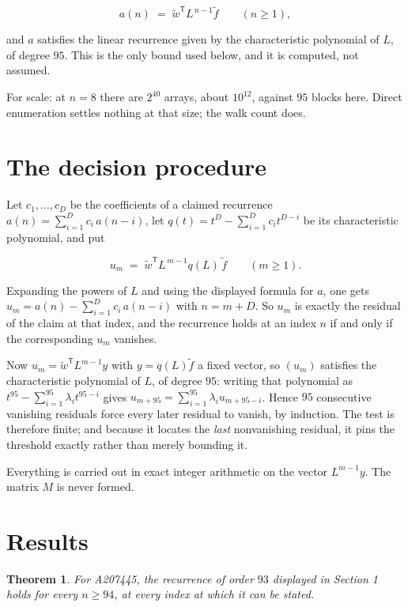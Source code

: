 \documentclass[11pt]{article}
\newtheorem{theorem}{Theorem}
\theoremstyle{definition}
\begin{document}
\[a(n) \;=\; \tilde w^{\mathsf T} L^{\,n-1} \tilde f \qquad (n \ge 1),\]

and $a$ satisfies the linear recurrence given by the characteristic polynomial of $L$, of degree $95$. This is the only bound used below, and it is computed, not assumed.

For scale: at $n = 8$ there are $2^{40}$ arrays, about $10^{12}$, against $95$ blocks here. Direct enumeration settles nothing at that size; the walk count does.

\section{The decision procedure}

Let $c_1,\dots,c_D$ be the coefficients of a claimed recurrence $a(n) = \sum_{i=1}^{D} c_i\,a(n-i)$, let $q(t) = t^{D} - \sum_{i=1}^{D} c_i t^{D-i}$ be its characteristic polynomial, and put

\[u_m \;=\; \tilde w^{\mathsf T} L^{\,m-1} q(L)\,\tilde f \qquad (m \ge 1).\]

Expanding the powers of $L$ and using the displayed formula for $a$, one gets $u_m = a(n) - \sum_{i=1}^{D} c_i\,a(n-i)$ with $n = m + D$. So $u_m$ is exactly the residual of the claim at that index, and the recurrence holds at an index $n$ if and only if the corresponding $u_m$ vanishes.

Now $u_m = \tilde w^{\mathsf T} L^{m-1} y$ with $y = q(L)\tilde f$ a fixed vector, so $(u_m)$ satisfies the characteristic polynomial of $L$, of degree $95$: writing that polynomial as $t^{95} - \sum_{i=1}^{95} \lambda_i t^{95-i}$ gives $u_{m+95} = \sum_{i=1}^{95} \lambda_i u_{m+95-i}$. Hence $95$ consecutive vanishing residuals force every later residual to vanish, by induction. The test is therefore finite; and because it locates the {\itshape last} nonvanishing residual, it pins the threshold exactly rather than merely bounding it.

Everything is carried out in exact integer arithmetic on the vector $L^{m-1}y$. The matrix $M$ is never formed.

\section{Results}

\begin{theorem} For A207445, the recurrence of order $93$ displayed in Section 1 holds for every $n \ge 94$, at every index at which it can be stated.\end{theorem}
\end{document}
